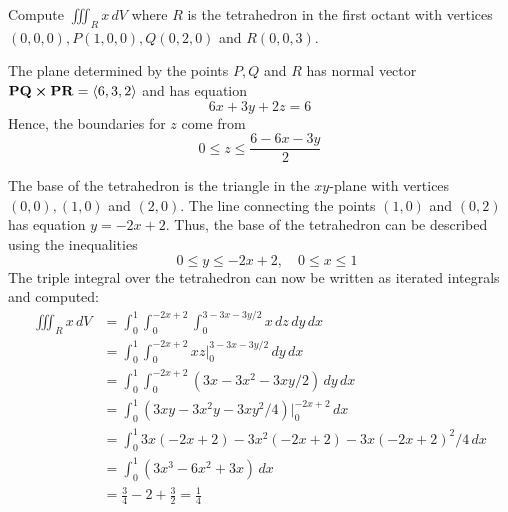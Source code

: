 \documentclass[handout]{ximera}
\begin{document}
\begin{example}[Example 2]
Compute $\iiint_R x \, dV$ where $R$ is the tetrahedron in the first octant with 
vertices $(0,0,0), P(1, 0, 0), Q(0, 2, 0)$ and $R(0,0,3)$.


The plane determined by the points $P, Q$ and $R$ has normal vector $\mathbf{PQ} \boldsymbol\times \mathbf{PR} = \left\langle 6, 3, 2\right\rangle$
and has equation 
\[
6x + 3y + 2z = 6
\]
Hence, the boundaries for $z$ come from
\[
0 \leq z \leq \frac{6 - 6x - 3y}{2}
\]

The base of the tetrahedron is the triangle in the $xy$-plane with vertices $(0,0), (1,0)$ and $(2,0)$. 
The line connecting the points $(1,0)$ and $(0,2)$ has equation $y = -2x + 2$.
Thus, the base of the tetrahedron can be described using the inequalities
\[
\quad 0 \leq y \leq -2x+2, \quad 0 \leq x \leq 1
\]
The triple integral over the tetrahedron can now be written as iterated integrals and computed:
\begin{align*}
\iiint_R x \, dV & = \int_0^1 \int_0^{-2x+2} \int_0^{3 - 3x - 3y/2} x \, dz\, dy \, dx\\
                 & = \int_0^1 \int_0^{-2x+2}  xz\bigg|_0^{3 - 3x - 3y/2} \, dy \, dx\\
                 & = \int_0^1 \int_0^{-2x+2}  (3x - 3x^2 - 3xy/2) \, dy \, dx\\
                 &= \int_0^1   (3xy - 3x^2y - 3xy^2/4)\bigg|_0^{-2x+2} \, dx\\
                 &= \int_0^1 3x(-2x+2) -3x^2(-2x+2) -3x(-2x+2)^2/4 \, dx\\
                 &= \int_0^1   (3x^3 - 6x^2  +  3x)   \, dx\\
                 &= \frac34 - 2 + \frac32 = \frac14
\end{align*}  

\end{example}
\end{document}
